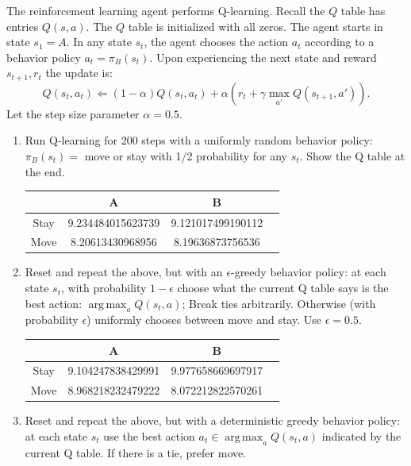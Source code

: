 \documentclass[a4paper]{article}
\theoremstyle{definition}
\DeclareMathOperator*{\argmax}{arg\,max}
\newenvironment{soln}{
    \leavevmode\color{blue}\ignorespaces
}{}
\begin{document}
The reinforcement learning agent performs Q-learning.  Recall the $Q$ table has entries $Q(s,a)$.
The $Q$ table is initialized with all zeros.
The agent starts in state $s_1=A$.
In any state $s_t$, the agent chooses the action $a_t$ according to a behavior policy $a_t = \pi_B(s_t)$.
Upon experiencing the next state and reward $s_{t+1}, r_t$ the update is:
$$Q(s_t, a_t) \Leftarrow (1-\alpha) Q(s_t, a_t) + \alpha \left( r_t + \gamma \max_{a'} Q(s_{t+1}, a') \right).$$
Let the step size parameter $\alpha=0.5$.

\begin{enumerate}
\item Run Q-learning for 200 steps with a uniformly random behavior policy: $\pi_B(s_t)=$ move or stay with 1/2 probability for any $s_t$.
Show the Q table at the end.

\begin{soln}

\begin{center}
\begin{tabular}{c|ccc}
& A & B \\\hline
Stay&9.234484015623739&9.121017499190112&\\
Move&8.20613430968956&8.19636873756536&
\end{tabular}
\end{center}
	
\end{soln}

\item Reset and repeat the above, but with an $\epsilon$-greedy behavior policy: at each state $s_t$, with probability $1-\epsilon$ choose what the current Q table says is the best action: $\argmax_a Q(s_t,a)$; Break ties arbitrarily. Otherwise (with probability $\epsilon$) uniformly chooses between move and stay.
Use $\epsilon=0.5$.


\begin{soln}

\begin{center}
\begin{tabular}{c|ccc}
& A & B \\\hline
Stay&9.104247838429991&9.977658669697917&\\
Move&8.968218232479222&8.072212822570261&
\end{tabular}
\end{center}
	
\end{soln}


\item Reset and repeat the above, but with a deterministic greedy behavior policy: at each state $s_t$ use the best action $a_t \in \argmax_a Q(s_t,a)$ indicated by the current Q table. If there is a tie, prefer move.


\end{enumerate}
\end{document}
